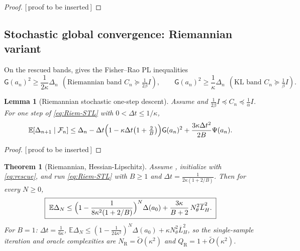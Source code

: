 \documentclass[11pt]{article}
\theoremstyle{plain}
\newtheorem{theorem}{Theorem}[section]
\newtheorem{lemma}[lemma]{Lemma}
\theoremstyle{definition}
\theoremstyle{remark}
\newcommand{\E}{\mathbb{E}}
\newcommand{\Id}{I}
\newcommand{\Riem}{\mathrm{R}}
\newcommand{\Fil}{\mathcal{F}}
\newcommand{\Gradnorm}{\mathsf{G}}
\newcommand{\barLH}{\overline{L}_H}
\newcommand{\PROOFHOLE}{{\color{red}\textsf{[\,proof to be inserted\,]}}}
\begin{document}
\begin{proof}
\PROOFHOLE
\end{proof}
\subsection{Stochastic global convergence: Riemannian variant}
\label{sec:stoch-Riem}

On the rescued bands,  gives the Fisher--Rao PL inequalities
\begin{equation}
\label{eq:PL-bands}
    \Gradnorm(a_n)^2\geq\frac1{2\kappa}\Delta_n\ \ (\text{Riemannian band }C_n\succeq\tfrac1{2\beta}\Id),
    \qquad
    \Gradnorm(a_n)^2\geq\frac1\kappa\Delta_n\ \ (\text{KL band }C_n\succeq\tfrac1\beta\Id).
\end{equation}

\begin{lemma}[Riemannian stochastic one-step descent]
\label{lem:Riem-onestep-stoch}
Assume  and $\tfrac1{2\beta}\Id\preceq C_n\preceq\tfrac1\alpha\Id$. For
one step of \eqref{eq:Riem-STL} with $0<\Delta t\leq1/\kappa$,
\begin{equation}
\label{eq:Riem-onestep-Psi}
    \E[\Delta_{n+1}\mid\Fil_n]
    \leq\Delta_n-\Delta t\Bigl(1-\kappa\Delta t\bigl(1+\tfrac2B\bigr)\Bigr)\Gradnorm(a_n)^2
    +\frac{3\kappa\Delta t^2}{2B}\Psi(a_n).
\end{equation}
\end{lemma}

\begin{proof}
\PROOFHOLE
\end{proof}

\begin{theorem}[Riemannian, Hessian-Lipschitz]
\label{thm:Riem-Hlip}
Assume , initialize with \eqref{eq:rescue}, and
run \eqref{eq:Riem-STL} with $B\geq1$ and $\Delta t=\tfrac1{2\kappa(1+2/B)}$. Then for every $N\geq0$,
\begin{equation}
\label{eq:Riem-Hlip}
    \boxed{\;
    \E\Delta_N\leq\Bigl(1-\frac1{8\kappa^2(1+2/B)}\Bigr)^N\Delta(a_0)+\frac{3\kappa}{B+2}\,N_\theta^2\barLH^2 .
    \;}
\end{equation}
For $B=1$: $\Delta t=\tfrac1{6\kappa}$, $\E\Delta_N\leq(1-\tfrac1{24\kappa^2})^N\Delta(a_0)+\kappa N_\theta^2\barLH^2$,
so the single-sample iteration and oracle complexities are $N_{\Riem}=\widetilde O(\kappa^2)$ and
$Q_{\Riem}=1+\widetilde O(\kappa^2)$.
\end{theorem}
\end{document}
